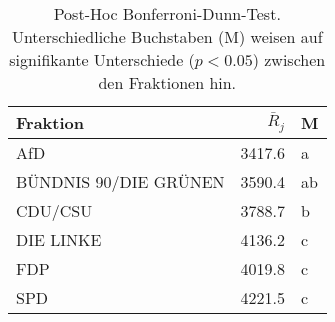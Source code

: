 \begin{table}[ht]
\centering
\begin{tabular}{lrl}
  \hline
Fraktion & $\bar{R}_{j}$ & M \\ 
  \hline
AfD & 3417.6 & a \\ 
  BÜNDNIS 90/DIE GRÜNEN & 3590.4 & ab \\ 
  CDU/CSU & 3788.7 & b \\ 
  DIE LINKE & 4136.2 & c \\ 
  FDP & 4019.8 & c \\ 
  SPD & 4221.5 & c \\ 
   \hline
\end{tabular}
\caption[Post-Hoc Bonferroni-Dunn-Test]{Post-Hoc Bonferroni-Dunn-Test. Unterschiedliche Buchstaben (M) 
weisen auf signifikante Unterschiede ($p < 0.05$) zwischen den Fraktionen hin.} 
\label{tab:dunn-test}
\end{table}
